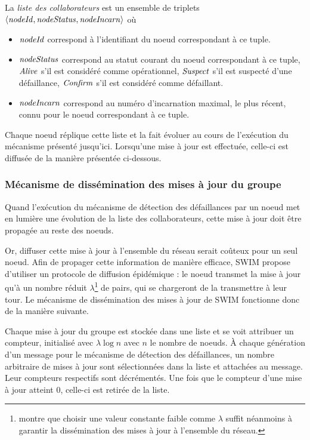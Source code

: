 \begin{definition}
  \label{def:collaborator-list}
  La \emph{liste des collaborateurs} est un ensemble de triplets $\langle \mathit{nodeId},\mathit{nodeStatus},\mathit{nodeIncarn} \rangle$ où
  \begin{itemize}
    \item $\mathit{nodeId}$ correspond à l'identifiant du noeud correspondant à ce tuple.
    \item $\mathit{nodeStatus}$ correspond au statut courant du noeud correspondant à ce tuple, \ie $\mathit{Alive}$ s'il est considéré comme opérationnel, $\mathit{Suspect}$ s'il est suspecté d'une défaillance, $\mathit{Confirm}$ s'il est considéré comme défaillant.
    \item $\mathit{nodeIncarn}$ correspond au numéro d'incarnation maximal, \ie le plus récent, connu pour le noeud correspondant à ce tuple.
  \end{itemize}
\end{definition}

Chaque noeud réplique cette liste et la fait évoluer au cours de l'exécution du mécanisme présenté jusqu'ici.
Lorsqu'une mise à jour est effectuée, celle-ci est diffusée de la manière présentée ci-dessous.

\subsubsection{Mécanisme de dissémination des mises à jour du groupe}

\label{sec:swim-update-dissemination}

Quand l'exécution du mécanisme de détection des défaillances par un noeud met en lumière une évolution de la liste des collaborateurs, cette mise à jour doit être propagée au reste des noeuds.

Or, diffuser cette mise à jour à l'ensemble du réseau serait coûteux pour un seul noeud.
Afin de propager cette information de manière efficace, SWIM propose d'utiliser un protocole de diffusion épidémique : le noeud transmet la mise à jour qu'à un nombre réduit $\lambda$\footnote{
  \cite{swim2002} montre que choisir une valeur constante faible comme $\lambda$ suffit néanmoins à garantir la dissémination des mises à jour à l'ensemble du réseau.
} de pairs, qui se chargeront de la transmettre à leur tour.
Le mécanisme de dissémination des mises à jour de SWIM fonctionne donc de la manière suivante.

Chaque mise à jour du groupe est stockée dans une liste et se voit attribuer un compteur, initialisé avec $\lambda \log{} n$ avec $n$ le nombre de noeuds.
À chaque génération d'un message pour le mécanisme de détection des défaillances, un nombre arbitraire de mises à jour sont sélectionnées dans la liste et attachées au message.
Leur compteurs respectifs sont décrémentés.
Une fois que le compteur d'une mise à jour atteint 0, celle-ci est retirée de la liste.

